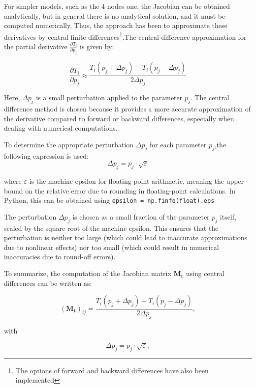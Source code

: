 For simpler models, such as the 4 nodes one, the Jacobian can be obtained analytically, but in general there is no analytical solution, and it must be computed numerically. Thus, the approach has been to approximate these derivatives by central finite differences\footnote{The options of forward and backward differences have also been implemented}.The central difference approximation for the partial derivative $\frac{\partial T_i}{\partial p_j}$ is given by:

\begin{equation}
    \frac{\partial T_i}{\partial p_j} \approx \frac{T_i(p_j + \Delta p_j) - T_i(p_j - \Delta p_j)}{2 \Delta p_j}
\end{equation}

Here, $\Delta p_j$ is a small perturbation applied to the parameter $p_j$. The central difference method is chosen because it provides a more accurate approximation of the derivative compared to forward or backward differences, especially when dealing with numerical computations.

To determine the appropriate perturbation $\Delta p_j$ for each parameter $p_j$,the following expression is used:
\begin{equation}
    \Delta p_j = p_j \cdot \sqrt{\varepsilon}
\end{equation}

where $\varepsilon$ is the machine epsilon for floating-point arithmetic, meaning the upper bound on the relative error due to rounding in floating-point calculations. In Python, this can be obtained using \lstinline{epsilon = np.finfo(float).eps}

The perturbation $\Delta p_j$ is chosen as a small fraction of the parameter $p_j$ itself, scaled by the square root of the machine epsilon. This  ensures that the perturbation is neither too large (which could lead to inaccurate approximations due to nonlinear effects) nor too small (which could result in numerical inaccuracies due to round-off errors).

To summarize, the computation of the Jacobian matrix $\bm{M_t}$ using central differences can be written as:


\begin{equation}
    \left(\bm{M_t}\right)_{ij} = \frac{T_i(p_j + \Delta p_j) - T_i(p_j - \Delta p_j)}{2 \Delta p_j},
\end{equation}

with


\begin{equation}
    \Delta p_j = p_j \cdot \sqrt{\varepsilon},
\end{equation}

